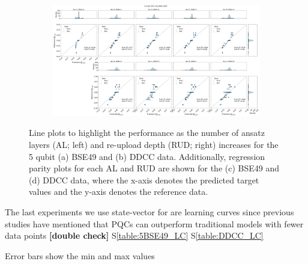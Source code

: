 \documentclass[journal=jacsat,manuscript=article]{achemso}
\newcommand{\siref}[1]{S\ref{#1}}
\begin{document}
\begin{figure}[H]
	\begin{subfigure}[b]{0.65\textwidth}
		\centering
		\includegraphics[width=\linewidth]{../images/DDCC/distribution_parity}
		\caption{}
		\label{fig:ddccdistribution_parity}
	\end{subfigure}	
	\caption{Line plots to highlight the performance as the number of ansatz layers (AL; left) and re-upload depth (RUD; right) increases for the 5 qubit (a) BSE49 and (b) DDCC data. Additionally, regression parity plots for each AL and RUD are shown for the (c) BSE49 and (d) DDCC data, where the x-axis denotes the predicted target values and the y-axis denotes the reference data.}
	\label{fig:BSE_distribution_parity}	
\end{figure}




The last experiments we use state-vector for are learning curves since previous studies have mentioned that PQCs can outperform traditional models with fewer data points \cite{suzuki_predicting_2020,hatakeyama-sato_quantum_2023} \textbf{[double check]}
\siref{table:5BSE49_LC}
\siref{table:DDCC_LC}

Error bars show the min and max values
\end{document}
